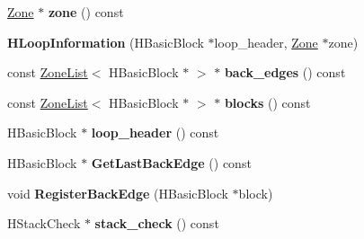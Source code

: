 \begin{DoxyCompactItemize}
\item 
\hypertarget{classv8_1_1internal_1_1_v8___f_i_n_a_l_a9dd2b3775a31619fcd5f9a26ba08d1d6}{}\hyperlink{classv8_1_1internal_1_1_zone}{Zone} $\ast$ {\bfseries zone} () const \label{classv8_1_1internal_1_1_v8___f_i_n_a_l_a9dd2b3775a31619fcd5f9a26ba08d1d6}

\item 
\hypertarget{classv8_1_1internal_1_1_v8___f_i_n_a_l_a271efc5c43706088306e24094ca10ef2}{}{\bfseries H\+Loop\+Information} (H\+Basic\+Block $\ast$loop\+\_\+header, \hyperlink{classv8_1_1internal_1_1_zone}{Zone} $\ast$zone)\label{classv8_1_1internal_1_1_v8___f_i_n_a_l_a271efc5c43706088306e24094ca10ef2}

\item 
\hypertarget{classv8_1_1internal_1_1_v8___f_i_n_a_l_a97af1c6b4b5e67d403599a9639751d1a}{}const \hyperlink{classv8_1_1internal_1_1_zone_list}{Zone\+List}$<$ H\+Basic\+Block $\ast$ $>$ $\ast$ {\bfseries back\+\_\+edges} () const \label{classv8_1_1internal_1_1_v8___f_i_n_a_l_a97af1c6b4b5e67d403599a9639751d1a}

\item 
\hypertarget{classv8_1_1internal_1_1_v8___f_i_n_a_l_a58f6a1791f940969c15c1be5cd0769bc}{}const \hyperlink{classv8_1_1internal_1_1_zone_list}{Zone\+List}$<$ H\+Basic\+Block $\ast$ $>$ $\ast$ {\bfseries blocks} () const \label{classv8_1_1internal_1_1_v8___f_i_n_a_l_a58f6a1791f940969c15c1be5cd0769bc}

\item 
\hypertarget{classv8_1_1internal_1_1_v8___f_i_n_a_l_a237817045ad46a93622d79ede0a17a1e}{}H\+Basic\+Block $\ast$ {\bfseries loop\+\_\+header} () const \label{classv8_1_1internal_1_1_v8___f_i_n_a_l_a237817045ad46a93622d79ede0a17a1e}

\item 
\hypertarget{classv8_1_1internal_1_1_v8___f_i_n_a_l_a14ebe55f48647a62a08143b0b79ce247}{}H\+Basic\+Block $\ast$ {\bfseries Get\+Last\+Back\+Edge} () const \label{classv8_1_1internal_1_1_v8___f_i_n_a_l_a14ebe55f48647a62a08143b0b79ce247}

\item 
\hypertarget{classv8_1_1internal_1_1_v8___f_i_n_a_l_a88ef66746ab833073acb245f18247e42}{}void {\bfseries Register\+Back\+Edge} (H\+Basic\+Block $\ast$block)\label{classv8_1_1internal_1_1_v8___f_i_n_a_l_a88ef66746ab833073acb245f18247e42}

\item 
\hypertarget{classv8_1_1internal_1_1_v8___f_i_n_a_l_a04ed42394324caa73ddbec8b8b636573}{}H\+Stack\+Check $\ast$ {\bfseries stack\+\_\+check} () const \label{classv8_1_1internal_1_1_v8___f_i_n_a_l_a04ed42394324caa73ddbec8b8b636573}


\end{DoxyCompactItemize}
